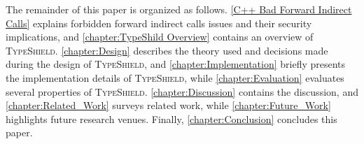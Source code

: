 

The remainder of this paper is organized as follows.
\cref{C++ Bad Forward Indirect Calls} explains forbidden forward indirect calls issues and their security implications, and 
\cref{chapter:TypeShild Overview} contains an overview of \textsc{TypeShield}.
\cref{chapter:Design} describes the theory used and decisions made during the design of \textsc{TypeShield}, and
\cref{chapter:Implementation} briefly presents the implementation details of \textsc{TypeShield}, while
\cref{chapter:Evaluation} evaluates several properties of \textsc{TypeShield}.
\cref{chapter:Discussion} contains the discussion, and
\cref{chapter:Related_Work} surveys related work, while
\cref{chapter:Future_Work} highlights future research venues. 
Finally, \cref{chapter:Conclusion} concludes this paper.


